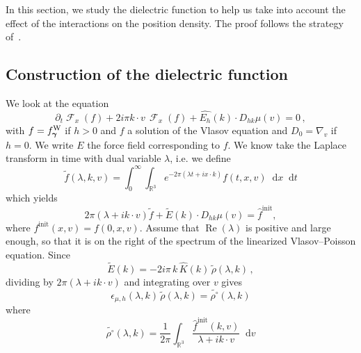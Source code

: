 \documentclass[a4paper,12pt]{amsart} %
\theoremstyle{plain}
\theoremstyle{definition}
\newcommand		{\RR}		{\mathbb R}			%
\newcommand		{\R}		{\RR}
\newcommand		{\Rd}		{\R^3}
\newcommand		{\lt}			{\left}				%
\newcommand		{\rt}			{\right}			%
\renewcommand	{\(}			{\lt(}
\renewcommand	{\)}			{\rt)}
\renewcommand		{\d}		{\mathop{}\!\mathrm{d}}		%
\newcommand			{\dpt}		{\partial_t}
\newcommand			{\Dv}		{\nabla_v}
\DeclareMathOperator{\cF}		{\mathcal{F}}		%
\DeclareMathOperator{\re}		{Re}				%
\renewcommand	{\Re}[1]		{\re\!\( #1 \)}		%
\newcommand		{\intd}			{\int_{\Rd}}
\newcommand		{\init}			{\mathrm{init}}
\newcommand	{\h}			{h}
\newcommand		{\opgam}		{{\boldsymbol{\gamma}}}
\newcommand		{\op}			{\opgam}	%
\newcommand	 {\Wigner}[1]		{f^\textnormal{W}_{#1}}
\begin{document}


	In this section, we study the dielectric function to help us take into account the effect of the interactions on the position density. The proof follows the strategy of~\cite{bedrossian_linearized_2022, bian_linear_2024, degond_spectral_1986}.




\subsection{Construction of the dielectric function}


	We look at the equation
	\begin{equation*}
		\dpt \cF_x(f) + 2i\pi k\cdot v \,\cF_x(f) + \widehat{E_\h}(k)\cdot D_{h k}\mu(v) = 0 \, ,
	\end{equation*}
	with $f = \Wigner{\op}$ if $h>0$ and $f$ a solution of the Vlasov equation and $D_0 = \Dv$ if $h=0$. We write $E$ the force field corresponding to $f$. We know take the Laplace transform in time with dual variable $\lambda$, i.e. we define
	\begin{equation*}
		\widetilde{f}(\lambda,k,v) = \int_0^\infty\!\!\!\intd e^{-2\pi\(\lambda t + i x\cdot k\)} f(t,x,v)\d x \d t
	\end{equation*}
	which yields
	\begin{equation*}
		2\pi\lt(\lambda + i k\cdot v\rt)\widetilde{f} + \widetilde{E}(k)\cdot D_{h k}\mu(v) = \widehat{f}^\init,
	\end{equation*}
	where $f^\init(x,v) = f(0,x,v)$. Assume that $\Re{\lambda}$ is positive and large enough, so that it is on the right of the spectrum of the linearized Vlasov--Poisson equation. Since 
	\begin{equation*}
	\widetilde{E}(k) = -2i\pi\, k\,\widehat{K}(k)\, \widetilde{\rho}(\lambda,k) \, ,
	\end{equation*}
	dividing by $ 2\pi \lt(\lambda + i k\cdot v \rt)$ and integrating over $v$ gives
	\begin{equation} \label{division}
		\epsilon_{\mu,\h}(\lambda,k)\, \widetilde{\rho}(\lambda,k) = \widetilde{\rho^\circ}(\lambda,k)
	\end{equation}
	where
	\begin{equation*}
		\widetilde{\rho^\circ}(\lambda,k) = \frac{1}{2\pi}\intd \frac{\widehat{f}^\init(k,v)}{\lambda + i k\cdot v} \d v
	\end{equation*}
\end{document}

